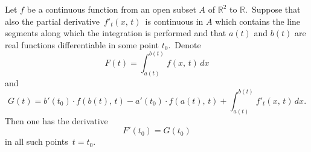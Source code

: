 \documentclass[12pt]{article}
\begin{document}
Let $f$ be a continuous function from an open subset $A$ of $\mathbb{R}^2$ to $\mathbb{R}$.\, Suppose that also the partial derivative\, $f'_t(x,\,t)$\, is continuous in $A$ which contains the line segments along which the integration is performed and that $a(t)$ and $b(t)$ are real functions differentiable in some point $t_0$.\, Denote
$$F(t) = \int_{a(t)}^{b(t)}f(x,\,t)\,dx$$
and 
$$G(t) = b'(t_0)\cdot f(b(t),\,t)-a'(t_0)\cdot f(a(t),\,t)
            +\int_{a(t)}^{b(t)}f'_t(x,\,t)\,dx.$$
Then one has the derivative
$$F'(t_0) = G(t_0)$$
in all such points\, $t = t_0$.
\end{document}
